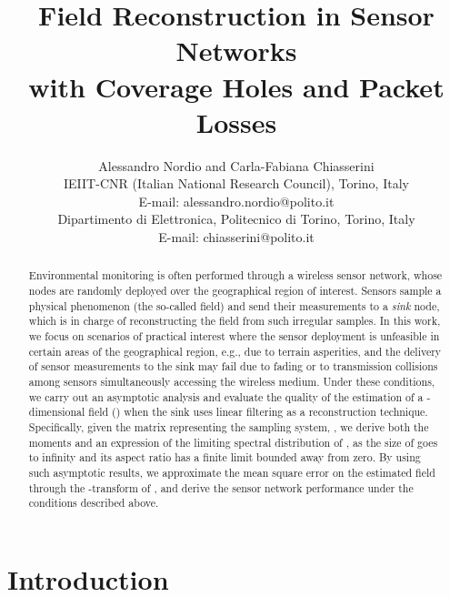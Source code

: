 \documentclass[11pt, draftcls, onecolumn, a4paper]{IEEEtran}
\begin{document}
\title{Field Reconstruction in Sensor Networks\\
with Coverage Holes and Packet Losses}
\author{Alessandro Nordio and Carla-Fabiana Chiasserini
\vspace{3mm}\\
 IEIIT-CNR (Italian National Research Council), Torino, Italy\\
        E-mail: alessandro.nordio@polito.it
\vspace{3mm}\\
 Dipartimento di Elettronica, Politecnico di Torino, Torino, Italy\\
        E-mail: chiasserini@polito.it}

\maketitle

\begin{abstract}
Environmental monitoring is often performed through a wireless sensor
network, whose nodes are randomly deployed over the geographical
region of interest. Sensors sample a physical phenomenon (the
so-called field) and send their measurements to a {\em sink} node,
which is in charge of reconstructing the field from such irregular
samples.  In this work, we focus on scenarios of practical interest
where the sensor deployment is unfeasible in certain areas of the 
geographical region,
e.g., due to terrain asperities, and the delivery of sensor
measurements to the sink may fail due to fading or to transmission collisions 
among sensors simultaneously accessing the wireless medium.
Under these conditions, we carry out an asymptotic analysis and evaluate
the quality of the estimation of a -dimensional field () 
when the sink uses linear filtering as a reconstruction technique.
Specifically, given the matrix representing the sampling system,
, we derive both the moments and an expression of the limiting
spectral distribution of , as the size of  goes to
infinity and its aspect ratio has a finite limit bounded away from
zero.  By using such asymptotic results, we approximate the mean
square error on the estimated field through the -transform of
, and derive the sensor network performance 
under the conditions described above.
\end{abstract}


\section{Introduction}
\end{document}
